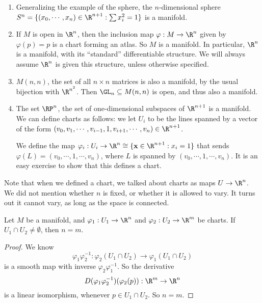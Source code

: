 \documentclass[a4paper]{article}
\begin{document}
\begin{eg}\leavevmode
  \begin{enumerate}
    \item Generalizing the example of the sphere, the $n$-dimensional sphere $S^n = \{(x_0, \cdots, x_n) \in \R^{n + 1}: \sum x_i^2 = 1\}$ is a manifold.
    \item If $M$ is open in $\R^n$, then the inclusion map $\varphi: M \to \R^n$ given by $\varphi(p) = p$ is a chart forming an atlas. So $M$ is a manifold. In particular, $\R^n$ is a manifold, with its ``standard'' differentiable structure. We will always assume $\R^n$ is given this structure, unless otherwise specified.
    \item $M(n, n)$, the set of all $n \times n$ matrices is also a manifold, by the usual bijection with $\R^{n^2}$. Then $\GL_n \subseteq M(n, n)$ is open, and thus also a manifold.
    \item The set $\RP^n$, the set of one-dimensional subspaces of $\R^{n + 1}$ is a manifold. We can define charts as follows: we let $U_i$ to be the lines spanned by a vector of the form $(v_0, v_1, \cdots, v_{i - 1}, 1, v_{i + 1}, \cdots, v_n) \in \R^{n + 1}$.

      We define the map $\varphi_i: U_i \to \R^n \cong \{\mathbf{x} \in \R^{n + 1}: x_i = 1\}$ that sends $\varphi(L) = (v_0, \cdots, 1, \cdots, v_n)$, where $L$ is spanned by $(v_0, \cdots, 1, \cdots, v_n)$. It is an easy exercise to show that this defines a chart.
  \end{enumerate}
\end{eg}

Note that when we defined a chart, we talked about charts as maps $U \to \R^n$. We did not mention whether $n$ is fixed, or whether it is allowed to vary. It turns out it cannot vary, as long as the space is connected.

\begin{lemma}
  Let $M$ be a manifold, and $\varphi_1: U_1 \to \R^n$ and $\varphi_2: U_2 \to \R^m$ be charts. If $U_1 \cap U_2 \not= \emptyset$, then $n = m$.
\end{lemma}

\begin{proof}
  We know
  \[
    \varphi_1 \varphi_2^{-1}: \varphi_2(U_1 \cap U_2) \to \varphi_1(U_1 \cap U_2)
  \]
  is a smooth map with inverse $\varphi_2 \varphi_1^{-1}$. So the derivative
  \[
    D(\varphi_1 \varphi_2^{-1})(\varphi_2(p)): \R^m \to \R^n
  \]
  is a linear isomorphism, whenever $p \in U_1 \cap U_2$. So $n = m$.
\end{proof}
\end{document}

